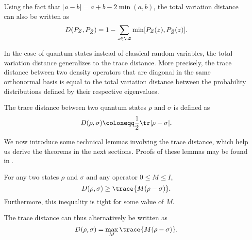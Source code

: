 Using the fact that $|a-b| = a+b-2 \min(a,b)$, the total variation
distance can also be written as
\begin{equation} \label{eq:vdist.alt} D(P_Z, P_{\tilde{Z}}) = 1-
  \sum_{z \in \cZ} \min[P_Z(z), P_{\tilde{Z}}(z)].\end{equation}

In the case of quantum states instead of classical random variables,
the total variation distance generalizes to the trace distance. More
precisely, the trace distance between two density operators that are
diagonal in the same orthonormal basis is equal to the total variation
distance between the probability distributions defined by their
respective eigenvalues.

\begin{deff}
  \label{def:tdist}
  The trace distance between two quantum states $\rho$ and $\sigma$ is
  defined as
  \[D(\rho,\sigma) \coloneqq \frac{1}{2} \tr |\rho-\sigma|.\]
\end{deff}

We now introduce some technical lemmas involving the trace distance,
which help us derive the theorems in the next sections. Proofs of
these lemmas may be found in \textcite{nielsen2010quantum}.

\begin{lem}
  \label{lem:op.definitions.pos}
  For any two states $\rho$ and $\sigma$ and any operator $0 \leq
  M \leq I$,
  \begin{equation} \label{eq:op.definitions.pos}
    D(\rho,\sigma) \geq \trace{M(\rho-\sigma)}.
  \end{equation}
  Furthermore, this inequality is tight for some value of $M$.
\end{lem}

The trace distance can thus alternatively be written
as \begin{equation} \label{eq:op.definitions.pos.d}
D(\rho,\sigma) = \max_M \trace{M(\rho-\sigma)}.\end{equation}

